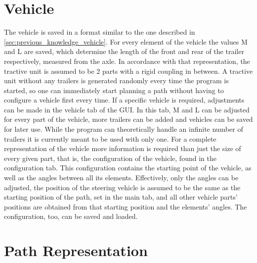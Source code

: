 \section{Vehicle}
\label{sec:vehicle}

The vehicle is saved in a format similar to the one described in \ref{sec:previous_knowledge_vehicle}. For every element of the vehicle the values M and L are saved, which determine the length of the front and rear of the trailer respectively, measured from the axle. In accordance with that representation, the tractive unit is assumed to be 2 parts with a rigid coupling in between. A tractive unit without any trailers is generated randomly every time the program is started, so one can immediately start planning a path without having to configure a vehicle first every time. If a specific vehicle is required, adjustments can be made in the vehicle tab of the GUI. In this tab, M and L can be adjusted for every part of the vehicle, more trailers can be added and vehicles can be saved for later use. While the program can theoretically handle an infinite number of trailers it is currently meant to be used with only one.
For a complete representation of the vehicle more information is required than just the size of every given part, that is, the configuration of the vehicle, found in the configuration tab. This configuration contains the starting point of the vehicle, as well as the angles between all its elements. Effectively, only the angles can be adjusted, the position of the steering vehicle is assumed to be the same as the starting position of the path, set in the main tab, and all other vehicle parts' positions are obtained from that starting position and the elements' angles. The configuration, too, can be saved and loaded.

\section{Path Representation}
\label{sec:path_representation}

